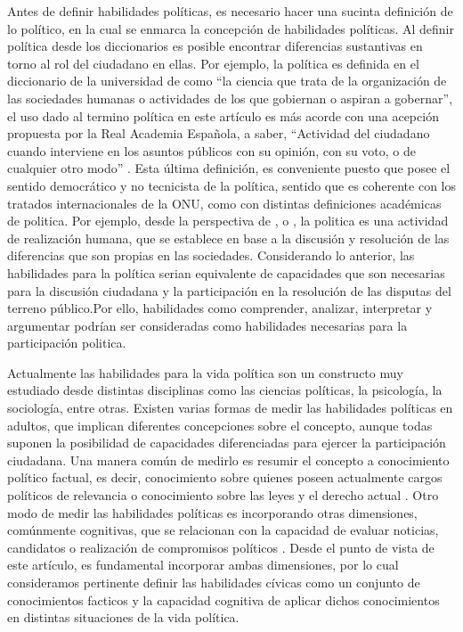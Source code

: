 \documentclass[12pt,twoside]{templates/facsothesis}
\begin{document}
Antes de definir habilidades políticas, es necesario hacer una sucinta definición de lo político, en la cual se enmarca la concepción de habilidades políticas. Al definir política desde los diccionarios es posible encontrar diferencias sustantivas en torno al rol del ciudadano en ellas. Por ejemplo, la política es definida en el diccionario de la universidad de \citet{oxfordPolitica2020} como ``la ciencia que trata de la organización de las sociedades humanas o actividades de los que gobiernan o aspiran a gobernar'', el uso dado al termino política en este artículo es más acorde con una acepción propuesta por la Real Academia Española, a saber, ``Actividad del ciudadano cuando interviene en los asuntos públicos con su opinión, con su voto, o de cualquier otro modo'' \citep{raePoliticoCa2014}. Esta última definición, es conveniente puesto que posee el sentido democrático y no tecnicista de la política, sentido que es coherente con los tratados internacionales de la ONU, como con distintas definiciones académicas de politica. Por ejemplo, desde la perspectiva de \citet{arendtQueEsPolitica2009}, \citet{lechnerConflictivaNuncaAcabada1984} o \citet{mouffeRetornoPoliticoComunidad1999}, la politica es una actividad de realización humana, que se establece en base a la discusión y resolución de las diferencias que son propias en las sociedades. Considerando lo anterior, las habilidades para la política serian equivalente de capacidades que son necesarias para la discusión ciudadana y la participación en la resolución de las disputas del terreno público.Por ello, habilidades como comprender, analizar, interpretar y argumentar podrían ser consideradas como habilidades necesarias para la participación politica.

Actualmente las habilidades para la vida política son un constructo muy estudiado desde distintas disciplinas como las ciencias políticas, la psicología, la sociología, entre otras. Existen varias formas de medir las habilidades políticas en adultos, que implican diferentes concepciones sobre el concepto, aunque todas suponen la posibilidad de capacidades diferenciadas para ejercer la participación ciudadana. Una manera común de medirlo es resumir el concepto a conocimiento político factual, es decir, conocimiento sobre quienes poseen actualmente cargos políticos de relevancia o conocimiento sobre las leyes y el derecho actual \citep{petricevicWhyCitizensNot2020, vanerkelWhyDonWe2020}. Otro modo de medir las habilidades políticas es incorporando otras dimensiones, comúnmente cognitivas, que se relacionan con la capacidad de evaluar noticias, candidatos o realización de compromisos políticos \citep{mondakCitizenGritEffects2020, duvalCitizensEvaluationsCampaign2018}. Desde el punto de vista de este artículo, es fundamental incorporar ambas dimensiones, por lo cual consideramos pertinente definir las habilidades cívicas como un conjunto de conocimientos facticos y la capacidad cognitiva de aplicar dichos conocimientos en distintas situaciones de la vida política.
\end{document}
